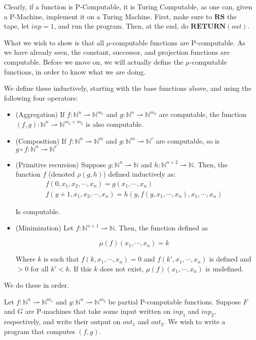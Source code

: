 \documentclass{article}
\newcommand{\N}{\mathbb{N}}
\newcommand{\RS}{\mathbf{RS}}
\newcommand{\RETURN}{\mathbf{RETURN}}
\begin{document}
	Clearly, if a function is P-Computable, it is Turing Computable, as one can, given a P-Machine, implement it on a Turing Machine. First, make sure to $\RS$ the tape, let $inp = 1$, and run the program. Then, at the end, do $\RETURN(out)$.
	
	What we wish to show is that all $\mu$-computable functions are P-computable. As we have already seen, the constant, successor, and projection functions are computable. Before we move on, we will actually define the $\mu$-computable functions, in order to know what we are doing.
	
	We define these inductively, starting with the base functions above, and using the following four operators:
	
	\begin{itemize}
	\item (Aggregation) If $f : \N^n \rightharpoonup \N^{m_1}$ and $g : \N^n \rightharpoonup \N^{m_2}$ are computable, the function $(f,g) : \N^n \rightharpoonup \N^{m_1 + m_2}$ is also computable.
	
	\item (Composition) If $f : \N^n \rightharpoonup \N^m$ and $g : \N^m \rightharpoonup \N^r$ are computable, so is $g \circ f : \N^n \rightharpoonup \N^r$
	
	\item (Primitive recursion) Suppose $g : \N^n \rightharpoonup \N$ and $h : \N^{n+2} \rightharpoonup \N$. Then, the function $f$ (denoted $\rho(g, h)$) defined inductively as:
	\begin{gather*}
	f(0, x_1, x_2, \cdots, x_n) = g(x_1, \cdots, x_n)\\
	f(y+1, x_1, x_2, \cdots, x_n) = h(y, f(y, x_1, \cdots, x_n), x_1, \cdots, x_n)
	\end{gather*}
	
	Is computable.
	
	\item (Minimization) Let $f : \N^{n+1} \rightharpoonup \N$. Then, the function defined as
	
	\[\mu(f)(x_1, \cdots, x_n) = k\]
	
	Where $k$ is such that $f(k, x_1, \cdots, x_n) = 0$ and $f(k', x_1, \cdots, x_n)$ is defined and $>0$ for all $k' <k$. If this $k$ does not exist, $\mu(f)(x_1, \cdots, x_n)$ is undefined.
	\end{itemize}
	
	We do these in order.
	
	Let $f : \N^n \rightharpoonup \N^{m_1}$ and $g : \N^n \rightharpoonup \N^{m_2}$ be partial P-computable functions. Suppose $F$ and $G$ are P-machines that take some input written on $inp_1$ and $inp_2$, respectively, and write their output on $out_1$ and $out_2$. We wish to write a program that computes $(f,g)$.
	
\end{document}
